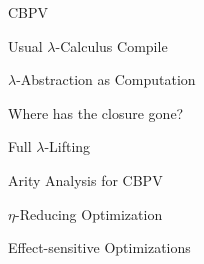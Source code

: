 \documentclass[letterpaper,10pt,aspectratio=169,dvipsnames]{beamer}
\begin{document}
\begin{frame}[fragile]{\acf{CBPV}}
\begin{tikzpicture}[fulloverlay]


  \end{tikzpicture}
\end{frame}

\begin{frame}{Usual \(\lambda\)-Calculus Compile}
\end{frame}

\begin{frame}{\(\lambda\)-Abstraction as Computation}
\end{frame}

\begin{frame}{Where has the closure gone?}
\end{frame}

\begin{frame}{Full \(\lambda\)-Lifting}
\end{frame}

\begin{frame}{Arity Analysis for CBPV}
\end{frame}

\begin{frame}{\(\eta\)-Reducing Optimization}
\end{frame}

\begin{frame}{Effect-sensitive Optimizations}
\end{frame}
\end{document}
